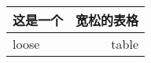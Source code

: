 \renewcommand\arraystretch{2}
\begin{tabular}{|l|r|}
\hline
这是一个 & 宽松的表格 \\ \hline
loose & table \\ \hline
\end{tabular}
